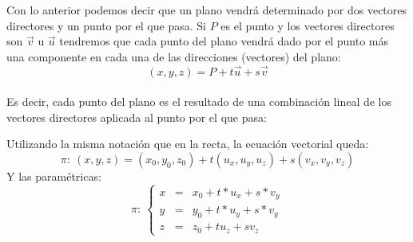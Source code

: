 \documentclass[a4paper,11pt,answers]{exam}
\begin{document}
Con lo anterior podemos decir que un plano vendrá determinado por dos vectores directores y un punto por el que pasa. Si $P$ es el punto y los vectores directores son $\vec{v}$ u $\vec{u}$ tendremos que cada punto del plano vendrá dado por el punto más una componente en cada una de las direcciones (vectores) del plano:
\[(x,y,z) = P + t\vec u + s \vec{v}\]\\
Es decir, cada punto del plano es el resultado de una combinación lineal de los vectores directores aplicada al punto por el que pasa:
\begin{center}
\end{center}

Utilizando la misma notación que en la recta, la ecuación vectorial queda:
\[\pi:\ (x,y,z) = (x_0, y_0, z_0) + t(u_x, u_y, u_z) + s (v_x, v_y, v_z)\]
Y las paramétricas:
\[\pi:\ \left\lbrace \begin{array}{lll}
	x &=& x_0 + t*u_x + s*v_y\\
	y &=& y_0 + t*u_y + s*v_y\\
	z &=& z_0 + tu_z + sv_z
\end{array}\right.\]
\end{document}
